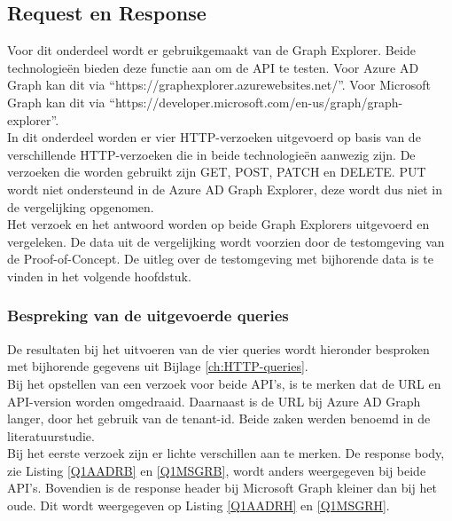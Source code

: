 \subsection{Request en Response} %

Voor dit onderdeel wordt er gebruikgemaakt van de Graph Explorer. Beide technologieën bieden deze functie aan om de \ac{API} te testen. Voor Azure \ac{AD} Graph kan dit via “https://graphexplorer.azurewebsites.net/”. Voor Microsoft Graph kan dit via “https://developer.microsoft.com/en-us/graph/graph-explorer”. \\

In dit onderdeel worden er vier HTTP-verzoeken uitgevoerd op basis van de verschillende \ac{HTTP}-verzoeken die in beide technologieën aanwezig zijn. De verzoeken die worden gebruikt zijn GET, POST, PATCH en DELETE. PUT wordt niet ondersteund in de Azure \ac{AD} Graph Explorer, deze wordt dus niet in de vergelijking opgenomen. \\

Het verzoek en het antwoord worden op beide Graph Explorers uitgevoerd en vergeleken. De data uit de vergelijking wordt voorzien door de testomgeving van de Proof-of-Concept. De uitleg over de testomgeving met bijhorende data is te vinden in het volgende hoofdstuk. 

\subsubsection{Bespreking van de uitgevoerde queries}

De resultaten bij het uitvoeren van de vier queries wordt hieronder besproken met bijhorende gegevens uit Bijlage \ref{ch:HTTP-queries}. \\

Bij het opstellen van een verzoek voor beide \Ac{API}'s, is te merken dat de \Ac{URL} en \Ac{API}-version worden omgedraaid. Daarnaast is de \Ac{URL} bij Azure \ac{AD} Graph langer, door het gebruik van de tenant-id. Beide zaken werden benoemd in de literatuurstudie. \\

Bij het eerste verzoek zijn er lichte verschillen aan te merken. De response body, zie Listing \ref{Q1AADRB} en \ref{Q1MSGRB}, wordt anders weergegeven bij beide \ac{API}'s. Bovendien is de response header bij Microsoft Graph kleiner dan bij het oude. Dit wordt weergegeven op Listing \ref{Q1AADRH} en \ref{Q1MSGRH}. \\

